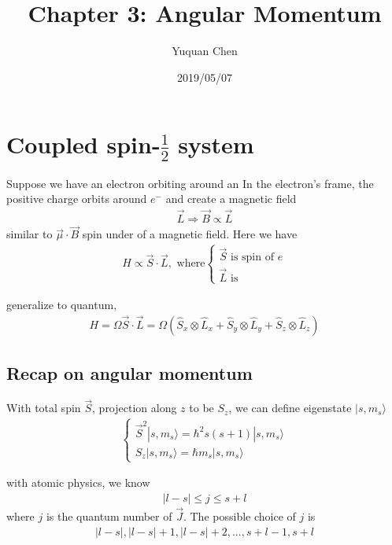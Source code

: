 \documentclass[UTF8,12pt]{article} %
\numberwithin{equation}{section}
\begin{document}
\title{Chapter 3: Angular Momentum}
\author{Yuquan Chen}
\date{2019/05/07} %
\maketitle

\section{Coupled spin-$\frac{1}{2}$ system}

Suppose we have an electron orbiting around an 
In the electron's frame, the positive charge orbits around $e^{-}$ and create a magnetic field
\begin{align}
\vec{L} \Rightarrow \vec{B} \propto \vec{L}
\end{align}
similar to $\vec{\mu}\cdot\vec{B}$ spin under of a magnetic field. Here we have
\begin{align}
H \propto \vec{S}\cdot\vec{L}, \text{ where}\begin{cases}\vec{S}\text{ is spin of }e\\\vec{L}\text{ is }\end{cases}
\end{align}


generalize to quantum,
\begin{align}
H = \Omega \vec{S}\cdot\vec{L} = \Omega \left(\hat{S}_{x}\otimes\hat{L}_{x} + \hat{S}_{y}\otimes\hat{L}_{y} + \hat{S}_{z}\otimes\hat{L}_{z}\right)
\end{align}

\subsection{Recap on angular momentum}

With total spin $\vec{S}$, projection along $z$ to be $S_{z}$, we can define eigenstate $|s,m_{s}\rangle$
\begin{align}
\begin{cases}\vec{S}^{2}|s,m_{s}\rangle = \hbar^{2}s(s+1)|s,m_{s}\rangle \\ S_{z}|s,m_{s}\rangle = \hbar m_{s}|s,m_{s}\rangle\end{cases}
\end{align}

with atomic physics, we know 
\begin{align}
|l-s| \le j \le s+l
\end{align}
where $j$ is the quantum number of $\vec{J}$. The possible choice of $j$ is
\begin{align}
|l-s|, |l-s|+1, |l-s|+2, ..., s+l-1, s+l
\end{align}
\end{document}
